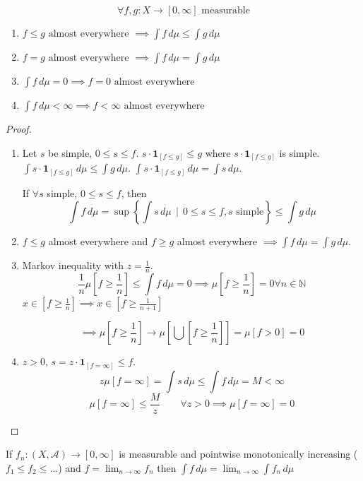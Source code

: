 \documentclass[a4paper]{article}
\numberwithin{lecref}{section}
\theoremstyle{break}
\newcommand{\SetDef}[2]{\left\{#1\,\mid\,#2\right\}}
\begin{document}
\begin{theorem}
  \[ \forall f, g: X \to [0, \infty] \text{ measurable} \]
  \begin{enumerate}
    \item $f \leq g \text{ almost everywhere } \implies \int f \, d\mu \leq \int g \, d\mu$
    \item $f = g \text{ almost everywhere } \implies \int f \, d\mu = \int g \, d\mu$
    \item $\int f \, d\mu = 0 \implies f = 0 \text{ almost everywhere}$
    \item $\int f \, d\mu < \infty \implies f < \infty \text{ almost everywhere}$
  \end{enumerate}
\end{theorem}
\begin{proof}
  \begin{enumerate}
    \item
      Let $s$ be simple, $0 \leq s \leq f$. $s \cdot \mathbf{1}_{[f \leq g]} \leq g$ where $s \cdot \mathbf{1}_{[f \leq g]}$ is simple. $\int s \cdot \mathbf 1_{[f \leq g]} \, d\mu \leq \int g \, d\mu$. $\int s \cdot \mathbf 1_{[f \leq g]} \, d\mu = \int s \, d\mu$.

      If $\forall s$ simple, $0 \leq s \leq f$, then
      \[ \int f \, d\mu = \sup\SetDef{\int s \, d\mu}{0 \leq s \leq f, s \text{ simple}} \leq \int g \, d\mu \]
    \item 
      $f \leq g$ almost everywhere and $f \geq g$ almost everywhere $\implies \int f \, d\mu = \int g \, d\mu$.
    \item
      Markov inequality with $z = \frac1n$.
      \[ \frac1n \mu\left[f \geq \frac1n\right] \leq \int f \, d\mu = 0 \implies \mu\left[f \geq \frac1n\right] = 0 \forall n \in \mathbb N \]
      $x \in \left[f \geq \frac1n\right] \implies x \in \left[f \geq \frac{1}{n+1}\right]$

      \[ \implies \mu\left[f \geq \frac{1}{n}\right] \to \mu\left[\bigcup\left[f \geq \frac1n\right]\right] = \mu\left[f > 0\right] = 0 \]
    \item
      $z > 0$, $s = z \cdot \mathbf 1_{[f = \infty]} \leq f$.
      \[ z \mu[f = \infty] = \int s \, d\mu \leq \int f \, d\mu = M < \infty \]
      \[ \mu[f = \infty] \leq \frac{M}{z} \qquad \forall z > 0 \implies \mu[f = \infty] = 0 \]
  \end{enumerate}
\end{proof}

\begin{theorem}
  If $f_n: (X, \mathcal A) \to [0, \infty]$ is measurable and pointwise monotonically increasing ($f_1 \leq f_2 \leq \dots$) and $f = \lim_{n\to\infty} f_n$ then $\int f \, d\mu = \lim_{n\to\infty} \int f_n \, d\mu$
\end{theorem}
\end{document}
